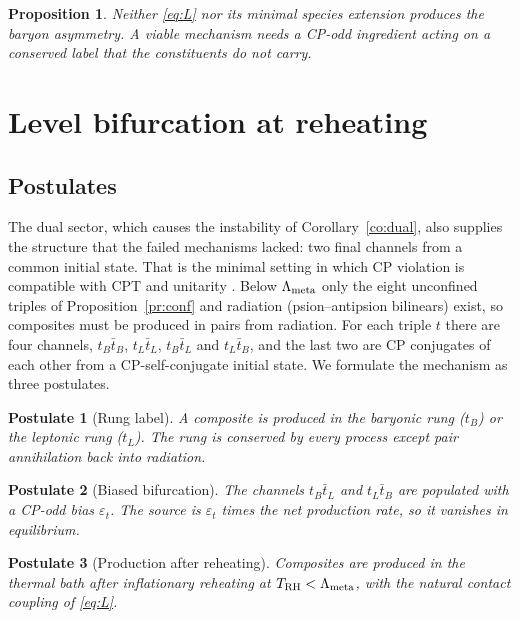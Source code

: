 \documentclass[11pt]{article}
\newtheorem{proposition}[theorem]{Proposition}
\newtheorem{postulate}{Postulate}
\newcommand{\Lm}{\Lambda_{\rm meta}}
\newcommand{\TRH}{T_{\rm RH}}
\begin{document}
\begin{proposition}\label{pr:window}
Neither \eqref{eq:L} nor its minimal species extension produces the baryon asymmetry. A viable mechanism needs a CP-odd ingredient acting on a conserved label that the constituents do not carry.
\end{proposition}

\section{Level bifurcation at reheating}\label{sec:bif}

\subsection{Postulates}

The dual sector, which causes the instability of Corollary~\ref{co:dual}, also supplies the structure that the failed mechanisms lacked: two final channels from a common initial state. That is the minimal setting in which CP violation is compatible with CPT and unitarity \cite{kw}. Below $\Lm$ only the eight unconfined triples of Proposition~\ref{pr:conf} and radiation (psion--antipsion bilinears) exist, so composites must be produced in pairs from radiation. For each triple $t$ there are four channels, $t_B\bar t_B$, $t_L\bar t_L$, $t_B\bar t_L$ and $t_L\bar t_B$, and the last two are CP conjugates of each other from a CP-self-conjugate initial state. We formulate the mechanism as three postulates.

\begin{postulate}[Rung label]\label{P1}
A composite is produced in the baryonic rung ($t_B$) or the leptonic rung ($t_L$). The rung is conserved by every process except pair annihilation back into radiation.
\end{postulate}

\begin{postulate}[Biased bifurcation]\label{P2}
The channels $t_B\bar t_L$ and $t_L\bar t_B$ are populated with a CP-odd bias $\varepsilon_t$. The source is $\varepsilon_t$ times the net production rate, so it vanishes in equilibrium.
\end{postulate}

\begin{postulate}[Production after reheating]\label{P3}
Composites are produced in the thermal bath after inflationary reheating at $\TRH<\Lm$, with the natural contact coupling of \eqref{eq:L}.
\end{postulate}
\end{document}
